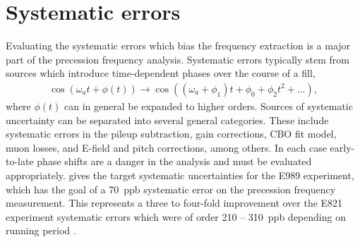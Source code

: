 
\thispagestyle{myheadings}

\graphicspath{{Body/Figures/Wa/Datasets/Endgame/LostMuonFiles/MainCuts/}{Body/Figures/Wa/Datasets/ComparisonPlots/LostMuons/}{Body/Figures/Wa/Datasets/9d/SingleIteration/LostMuonFits/}{Body/Figures/Wa/Datasets/9d/PileupJobs/PileupGapTime/}{Body/Figures/Wa/Datasets/9d/PileupJobs/PileupDeadTime/auto-scaling/}{Body/Figures/Wa/Datasets/9d/PileupJobs/PileupDeadTime/fixed-scaling/}{Body/Figures/Wa/Datasets/9d/PileupJobs/PileupEnergyScale/}{Body/Figures/Wa/Datasets/9d/PileupJobs/PileupTimeShift/}{Body/Figures/Wa/Datasets/9d/SingleIteration/PileupMultiplierScan/}{Body/Figures/Wa/Datasets/60h/RatioConstruction/Ta/}{Body/Figures/Wa/Datasets/60h/RatioConstruction/TauMu/}{Body/Figures/Wa/Datasets/9d/Binning/BinEdge/}{Body/Figures/Wa/Datasets/9d/Binning/BinWidth/}{Body/Figures/Wa/Datasets/60h/Gain/0p25-steps/}{Body/Figures/Wa/Datasets/60h/Gain/Lifetime/}}




\section{Systematic errors}
\label{sec:SystematicErrors}


Evaluating the systematic errors which bias the \wa frequency extraction is a major part of the precession frequency analysis. Systematic errors typically stem from sources which introduce time-dependent phases over the course of a fill,
    \begin{align} \label{eq:timeDependentPhase}
        \cos{(\omega_{a}t + \phi(t))} \rightarrow \cos{((\omega_{a}+\phi_{1})t + \phi_{0} + \phi_{2}t^{2} + ...)},
    \end{align}
where $\phi(t)$ can in general be expanded to higher orders. Sources of systematic uncertainty can be separated into several general categories. These include systematic errors in the pileup subtraction, gain corrections, CBO fit model, muon losses, and E-field and pitch corrections, among others. In each case early-to-late phase shifts are a danger in the analysis and must be evaluated appropriately.  gives the target systematic uncertainties for the E989 experiment, which has the goal of a \SI{70}{ppb} systematic error on the precession frequency measurement. This represents a three to four-fold improvement over the E821 experiment systematic errors which were of order \SI{210}{} -- \SI{310}{ppb} depending on running period \cite{E821FinalReport}.

